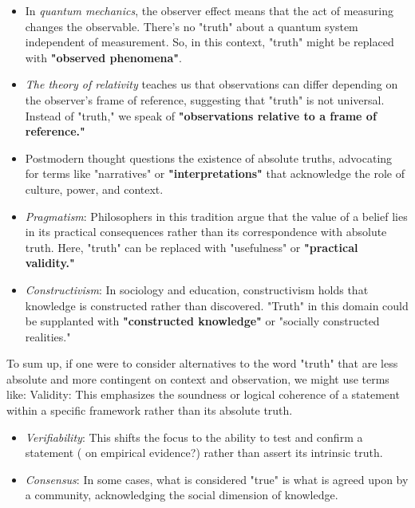 \documentclass[11pt,a4]{article}
\begin{document}
\begin{itemize}

    \item In \textit{quantum mechanics}, the observer effect means that the act of measuring changes the observable. There's no "truth" about a quantum system independent of measurement. So, in this context, "truth" might be replaced with \textbf{"observed phenomena"}.
    \item \textit{The theory of relativity} teaches us that observations can differ depending on the observer's frame of reference, suggesting that "truth" is not universal. Instead of "truth," we speak of \textbf{"observations relative to a frame of reference."}
    \item Postmodern thought questions the existence of absolute truths, advocating for terms like "narratives" or \textbf{"interpretations"} that acknowledge the role of culture, power, and context.
    \item \textit{Pragmatism}: Philosophers in this tradition argue that the value of a belief lies in its practical consequences rather than its correspondence with absolute truth. Here, "truth" can be replaced with "usefulness" or \textbf{"practical validity."}
    \item \textit{Constructivism}: In sociology and education, constructivism holds that knowledge is constructed rather than discovered. "Truth" in this domain could be supplanted with \textbf{"constructed knowledge"} or "socially constructed realities."
\end{itemize}

To sum up, if one were to consider alternatives to the word "truth" that are less absolute and more contingent on context and observation, we might use terms like:
Validity: This emphasizes the soundness or logical coherence of a statement within a specific framework rather than its absolute truth.

\begin{itemize}

    \item \textit{Verifiability}: This shifts the focus to the ability to test and confirm a statement ( on empirical evidence?) rather than assert its intrinsic truth.
    \item \textit{Consensus}: In some cases, what is considered "true" is what is agreed upon by a community, acknowledging the social dimension of knowledge.

\end{itemize}
\end{document}
